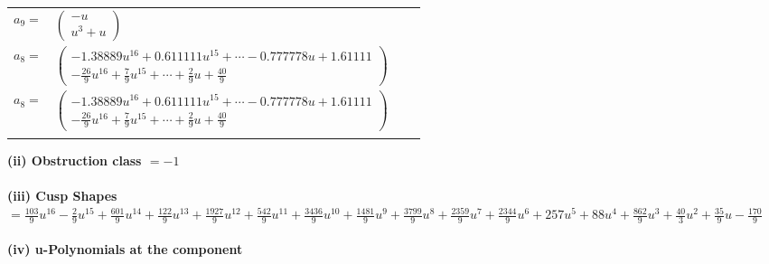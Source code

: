 \documentclass[1p]{elsarticle_modified}
\theoremstyle{definition}
\begin{document}
\begin{tabular}{m{7pt} m{180pt} m{7pt} m{180pt} }
\flushright $a_{9}=$&$\begin{pmatrix}- u\\u^3+u\end{pmatrix}$ \\
\flushright $a_{8}=$&$\begin{pmatrix}-1.38889 u^{16}+0.611111 u^{15}+\cdots-0.777778 u+1.61111\\-\frac{26}{9} u^{16}+\frac{7}{9} u^{15}+\cdots+\frac{2}{9} u+\frac{40}{9}\end{pmatrix}$\\ \flushright $a_{8}=$&$\begin{pmatrix}-1.38889 u^{16}+0.611111 u^{15}+\cdots-0.777778 u+1.61111\\-\frac{26}{9} u^{16}+\frac{7}{9} u^{15}+\cdots+\frac{2}{9} u+\frac{40}{9}\end{pmatrix}$\\&\end{tabular}
\flushleft \textbf{(ii) Obstruction class $= -1$}\\~\\
\flushleft \textbf{(iii) Cusp Shapes $= \frac{103}{9} u^{16}-\frac{2}{9} u^{15}+\frac{601}{9} u^{14}+\frac{122}{9} u^{13}+\frac{1927}{9} u^{12}+\frac{542}{9} u^{11}+\frac{3436}{9} u^{10}+\frac{1481}{9} u^9+\frac{3799}{9} u^8+\frac{2359}{9} u^7+\frac{2344}{9} u^6+257 u^5+88 u^4+\frac{862}{9} u^3+\frac{40}{3} u^2+\frac{35}{9} u-\frac{170}{9}$}\\~\\
\newpage\renewcommand{\arraystretch}{1}
\flushleft \textbf{(iv) u-Polynomials at the component}\newline \\
\end{document}
